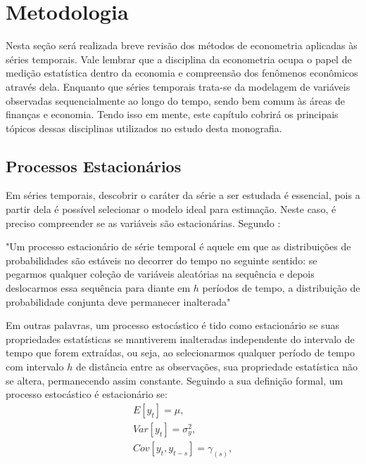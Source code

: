 \chapter{Metodologia}

Nesta seção será realizada breve revisão dos métodos de econometria aplicadas às séries temporais. Vale lembrar que a disciplina da econometria ocupa o papel de medição estatística dentro da economia e compreensão dos fenômenos econômicos através dela. Enquanto que séries temporais trata-se da modelagem de variáveis observadas sequencialmente ao longo do tempo, sendo bem comum às áreas de finanças e economia. Tendo isso em mente, este capítulo cobrirá os principais tópicos dessas disciplinas utilizados no estudo desta monografia.

\section{Processos Estacionários}

Em séries temporais, descobrir o caráter da série a ser estudada é essencial, pois a partir dela é possível selecionar o modelo ideal para estimação. Neste caso, é preciso compreender se as variáveis são estacionárias. Segundo :

\begin{citacao}
"Um processo estacionário de série temporal é aquele em que as distribuições de probabilidades são estáveis no decorrer do tempo no seguinte sentido: se pegarmos qualquer coleção de variáveis aleatórias na sequência e depois deslocarmos essa sequência para diante em $h$ períodos de tempo, a distribuição de probabilidade conjunta deve permanecer inalterada"
\cite{wooldridge}
\end{citacao}

Em outras palavras, um processo estocástico é tido como estacionário se suas propriedades estatísticas se mantiverem inalteradas independente do intervalo de tempo que forem extraídas, ou seja, ao selecionarmos qualquer período de tempo com intervalo $h$ de distância entre as observações, sua propriedade estatística não se altera, permanecendo assim constante. Seguindo a sua definição formal, um processo estocástico é estacionário se:
\begin{equation}\label{stacionarity}
\begin{split}
    E[y_t] = \mu, \\
    Var[y_t] = \sigma^2_y, \\
    Cov[y_t, y_{t-s}] = \gamma_{(s)},
\end{split}
\end{equation}

